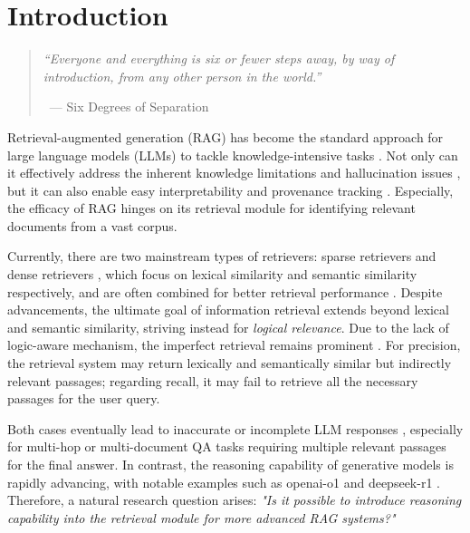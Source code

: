 \section{Introduction}
\label{sec:introduction}
\label{introduction}

\begin{quote}
    \textit{``Everyone and everything is six or fewer steps away, by way of introduction, from any other person in the world.''} 
\begin{flushright}
\qquad\;\;\, --- Six Degrees of Separation
\end{flushright}
\end{quote}
Retrieval-augmented generation (RAG) has become the standard approach for large language models (LLMs) to tackle knowledge-intensive tasks \citep{guu2020retrieval,lewis2020retrieval, izacard2022few, min-etal-2023-nonparametric, ram2023context,liang2025saferag}. Not only can it effectively address the inherent knowledge limitations and hallucination issues \cite{zhang_sirens_2023}, but it can also enable easy interpretability and provenance tracking \citep{akyurek-etal-2022-towards}. Especially, the efficacy of RAG hinges on its retrieval module for identifying relevant documents from a vast corpus.


Currently, there are two mainstream types of retrievers: sparse retrievers \citep{TF-IDF,BM25} and dense retrievers \citep{BGE,e52024multilingual,sturua2024jina,wang_qaencoder_2024}, which focus on lexical similarity and semantic similarity respectively, and are often combined for better retrieval performance \citep{sawarkar2024blended}.
Despite advancements, the ultimate goal of information retrieval extends beyond lexical and semantic similarity, striving instead for \textit{logical relevance}. Due to the lack of logic-aware mechanism, the imperfect retrieval remains prominent \citep{wang2024astute, shao2024scaling, dai2024unifying, su2024bright, su2024brightrealisticchallengingbenchmark}. For precision, the retrieval system may return lexically and semantically similar but indirectly relevant passages; regarding recall, it may fail to retrieve all the necessary passages for the user query. 

Both cases eventually lead to inaccurate or incomplete LLM responses \citep{chen2024benchmarking,xiang2024certifiably,zou2024poisonedrag}, especially for multi-hop or multi-document QA tasks requiring multiple relevant passages for the final answer.  
In contrast, the reasoning capability of generative models is rapidly advancing, with notable examples such as openai-o1 \citep{jaech2024openai} and deepseek-r1 \citep{guo2025deepseek}. Therefore, a natural research question arises: \textit{"Is it possible to introduce reasoning capability into the retrieval module for more advanced RAG systems?"} 

